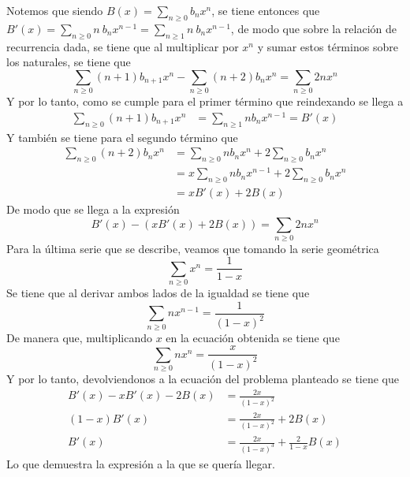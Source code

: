 \begin{solucion}
    Notemos que siendo $B(x)=\sum_{n\geq 0}b_nx^n$, se tiene entonces que $B'(x)=\sum_{n\geq 0}n\ b_nx^{n-1}=\sum_{n\geq 1}n\ b_nx^{n-1}$, de modo que sobre la relación de recurrencia dada, se tiene que al multiplicar por $x^{n}$ y sumar estos términos sobre los naturales, se tiene que
    \begin{equation*}
        \sum_{n\geq 0}(n+1)b_{n+1}x^{n}-\sum_{n\geq 0}(n+2)b_{n}x^{n}=\sum_{n\geq 0}2nx^{n}
    \end{equation*}
    Y por lo tanto, como se cumple para el primer término que reindexando se llega a
    \begin{align*}
        \sum_{n\geq 0}(n+1)b_{n+1}x^{n}&=\sum_{n\geq 1}nb_{n}x^{n-1}=B'(x)
    \end{align*}
    Y también se tiene para el segundo término que
    \begin{align*}
        \sum_{n\geq 0}(n+2)b_{n}x^{n}&=\sum_{n\geq 0}nb_{n}x^{n}+2\sum_{n\geq 0}b_{n}x^{n}\\
        &=x\sum_{n\geq 0}nb_{n}x^{n-1}+2\sum_{n\geq 0}b_{n}x^{n}\\
        &=xB'(x) + 2B(x)
    \end{align*}
    De modo que se llega a la expresión
    \begin{equation*}
        B'(x)-(xB'(x) + 2B(x))=\sum_{n\geq 0}2nx^{n}
    \end{equation*}
    Para la última serie que se describe, veamos que tomando la serie geométrica
    \begin{equation*}
        \sum_{n\geq 0}x^n=\frac{1}{1-x}
    \end{equation*}
    Se tiene que al derivar ambos lados de la igualdad se tiene que
    \begin{equation*}
        \sum_{n\geq 0}nx^{n-1}=\frac{1}{(1-x)^2}
    \end{equation*}
    De manera que, multiplicando $x$ en la ecuación obtenida se tiene que
    \begin{equation*}
        \sum_{n\geq 0}nx^{n}=\frac{x}{(1-x)^2}
    \end{equation*}
    Y por lo tanto, devolviendonos a la ecuación del problema planteado se tiene que
    \begin{align*}
        B'(x)-xB'(x) - 2B(x)&=\frac{2x}{(1-x)^2}\\
        (1-x)B'(x)&=\frac{2x}{(1-x)^2} + 2B(x)\\
        B'(x)&=\frac{2x}{(1-x)^3}+\frac{2}{1-x}B(x)
    \end{align*}
    Lo que demuestra la expresión a la que se quería llegar. 

    
\end{solucion}